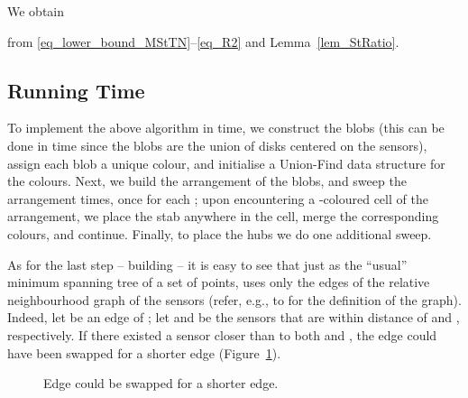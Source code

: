 \documentclass[11pt,a4paper]{article}
\theoremstyle{definition}
\theoremstyle{remark}
\begin{document}
We obtain

from \eqref{eq_lower_bound_MStTN}--\eqref{eq_R2} and Lemma~\ref{lem_StRatio}.

\subsection{Running Time}

To implement the above algorithm in  time, we construct the blobs (this can be done in  time since the blobs are the union of disks centered on the sensors), assign each blob a unique colour, and initialise a Union-Find data structure for the colours. Next, we build the arrangement of the blobs, and sweep the arrangement  times, once for each ; upon encountering a -coloured cell of the arrangement, we place the stab anywhere in the cell, merge the corresponding  colours, and continue. Finally, to place the hubs we do one additional sweep.

As for the last step -- building  -- it is easy to see that just as the ``usual'' minimum spanning tree of a set of points,  uses only the edges of the relative neighbourhood graph of the sensors (refer, e.g., to \citet[p.~217]{berg08computational} for the definition of the graph).
Indeed, let  be an edge of ; let  and  be the sensors that are within distance  of  and , respectively. If there existed a sensor  closer than  to both  and , the edge  could have been swapped for a shorter edge (Figure~\ref{fig:nlogn}).
\begin{figure}[ht]
\centering
{}
\caption{Edge  could be swapped for a shorter edge.}\label{fig:nlogn}
\end{figure}
\end{document}
